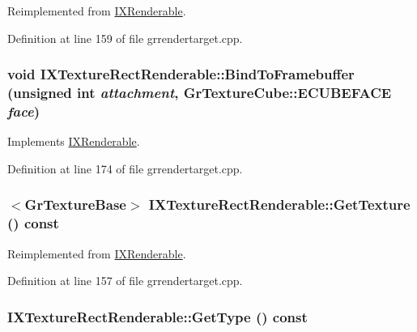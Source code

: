 Reimplemented from \hyperlink{class_i_x_renderable_4e47253020e9f0faabb51b37ee5e16ae}{IXRenderable}.

Definition at line 159 of file grrendertarget.cpp.\hypertarget{class_i_x_texture_rect_renderable_0a40ad04c48447177dfda83ff287474a}{
\subsubsection[{BindToFramebuffer}]{\setlength{\rightskip}{0pt plus 5cm}void IXTextureRectRenderable::BindToFramebuffer (unsigned int {\em attachment}, \/  {\bf GrTextureCube::ECUBEFACE} {\em face})}}
\label{class_i_x_texture_rect_renderable_0a40ad04c48447177dfda83ff287474a}




Implements \hyperlink{class_i_x_renderable_c5ea40caedef9885429ab5c7dccb0163}{IXRenderable}.

Definition at line 174 of file grrendertarget.cpp.\hypertarget{class_i_x_texture_rect_renderable_b257ec75b2b8544f82d4396f3d84a49a}{
\subsubsection[{GetTexture}]{$<${\bf GrTextureBase}$>$ IXTextureRectRenderable::GetTexture () const}}
\label{class_i_x_texture_rect_renderable_b257ec75b2b8544f82d4396f3d84a49a}




Reimplemented from \hyperlink{class_i_x_renderable_2a74a8b8f702af0557134858ec263aea}{IXRenderable}.

Definition at line 157 of file grrendertarget.cpp.\hypertarget{class_i_x_texture_rect_renderable_ad98e9d375ae185a8472381bae5d646e}{
\subsubsection[{GetType}]{ IXTextureRectRenderable::GetType () const}}
\label{class_i_x_texture_rect_renderable_ad98e9d375ae185a8472381bae5d646e}





